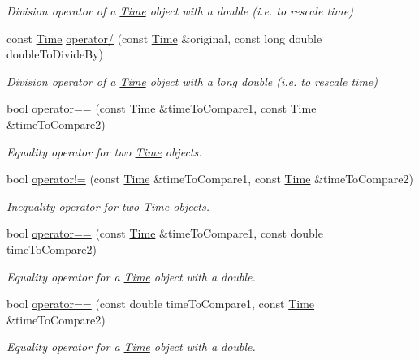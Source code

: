 \begin{DoxyCompactItemize}
\begin{DoxyCompactList}\small\item\em Division operator of a \hyperlink{classtudat_1_1Time}{Time} object with a double (i.\+e. to rescale time) \end{DoxyCompactList}\item 
const \hyperlink{classtudat_1_1Time}{Time} \hyperlink{classtudat_1_1Time_ad1c3e65f0853debbe42a2f3efda557d0}{operator/} (const \hyperlink{classtudat_1_1Time}{Time} \&original, const long double double\+To\+Divide\+By)
\begin{DoxyCompactList}\small\item\em Division operator of a \hyperlink{classtudat_1_1Time}{Time} object with a long double (i.\+e. to rescale time) \end{DoxyCompactList}\item 
bool \hyperlink{classtudat_1_1Time_a553562bc9f249dd59887948475bea35a}{operator==} (const \hyperlink{classtudat_1_1Time}{Time} \&time\+To\+Compare1, const \hyperlink{classtudat_1_1Time}{Time} \&time\+To\+Compare2)
\begin{DoxyCompactList}\small\item\em Equality operator for two \hyperlink{classtudat_1_1Time}{Time} objects. \end{DoxyCompactList}\item 
bool \hyperlink{classtudat_1_1Time_aba7aa506d348cfba3bc46b039bbd977b}{operator!=} (const \hyperlink{classtudat_1_1Time}{Time} \&time\+To\+Compare1, const \hyperlink{classtudat_1_1Time}{Time} \&time\+To\+Compare2)
\begin{DoxyCompactList}\small\item\em Inequality operator for two \hyperlink{classtudat_1_1Time}{Time} objects. \end{DoxyCompactList}\item 
bool \hyperlink{classtudat_1_1Time_abd8361248210d163e6171ca66a75cdd4}{operator==} (const \hyperlink{classtudat_1_1Time}{Time} \&time\+To\+Compare1, const double time\+To\+Compare2)
\begin{DoxyCompactList}\small\item\em Equality operator for a \hyperlink{classtudat_1_1Time}{Time} object with a double. \end{DoxyCompactList}\item 
bool \hyperlink{classtudat_1_1Time_a3318549eba72846e5d558356cbad218c}{operator==} (const double time\+To\+Compare1, const \hyperlink{classtudat_1_1Time}{Time} \&time\+To\+Compare2)
\begin{DoxyCompactList}\small\item\em Equality operator for a \hyperlink{classtudat_1_1Time}{Time} object with a double. \end{DoxyCompactList}\item 

\end{DoxyCompactItemize}
